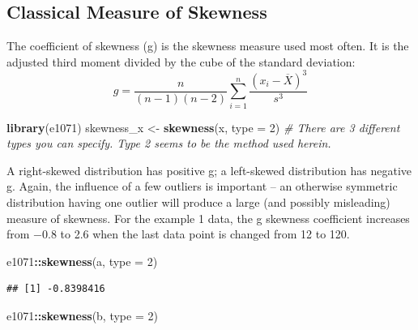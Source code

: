\documentclass[]{book}
\newenvironment{Shaded}{\begin{snugshade}}{\end{snugshade}}
\newcommand{\CommentTok}[1]{\textcolor[rgb]{0.56,0.35,0.01}{\textit{#1}}}
\newcommand{\DataTypeTok}[1]{\textcolor[rgb]{0.13,0.29,0.53}{#1}}
\newcommand{\DecValTok}[1]{\textcolor[rgb]{0.00,0.00,0.81}{#1}}
\newcommand{\KeywordTok}[1]{\textcolor[rgb]{0.13,0.29,0.53}{\textbf{#1}}}
\newcommand{\NormalTok}[1]{#1}
\newcommand{\OperatorTok}[1]{\textcolor[rgb]{0.81,0.36,0.00}{\textbf{#1}}}
\newcommand{\StringTok}[1]{\textcolor[rgb]{0.31,0.60,0.02}{#1}}
\begin{document}
\hypertarget{classical-measure-of-skewness}{%
\subsection{Classical Measure of Skewness}\label{classical-measure-of-skewness}}

The coefficient of skewness (g) is the skewness measure used most often. It is the adjusted third moment divided by the cube of the standard deviation:
\begin{equation}
g = \frac{n}{(n-1)(n-2)} \sum_{i = 1}^{n} \frac{(x_{i} - \overline{X})^{3}}{s^{3}}
\label{eq:1-10}
\end{equation}

\begin{Shaded}
\begin{Highlighting}[]
\KeywordTok{library}\NormalTok{(e1071)}
\NormalTok{skewness_x <-}\StringTok{ }\KeywordTok{skewness}\NormalTok{(x, }\DataTypeTok{type =} \DecValTok{2}\NormalTok{)}
\CommentTok{# There are 3 different types you can specify. Type 2 seems to be the method used herein.}
\end{Highlighting}
\end{Shaded}

A right-skewed distribution has positive g; a left-skewed distribution has negative g. Again, the influence of a few outliers is important -- an otherwise symmetric distribution having one outlier will produce a large (and possibly misleading) measure of skewness. For the example 1 data, the g skewness coefficient increases from −0.8 to 2.6 when the last data point is changed from 12 to
120.

\begin{Shaded}
\begin{Highlighting}[]
\NormalTok{e1071}\OperatorTok{::}\KeywordTok{skewness}\NormalTok{(a, }\DataTypeTok{type =} \DecValTok{2}\NormalTok{)}
\end{Highlighting}
\end{Shaded}

\begin{verbatim}
## [1] -0.8398416
\end{verbatim}

\begin{Shaded}
\begin{Highlighting}[]
\NormalTok{e1071}\OperatorTok{::}\KeywordTok{skewness}\NormalTok{(b, }\DataTypeTok{type =} \DecValTok{2}\NormalTok{)}
\end{Highlighting}
\end{Shaded}
\end{document}
